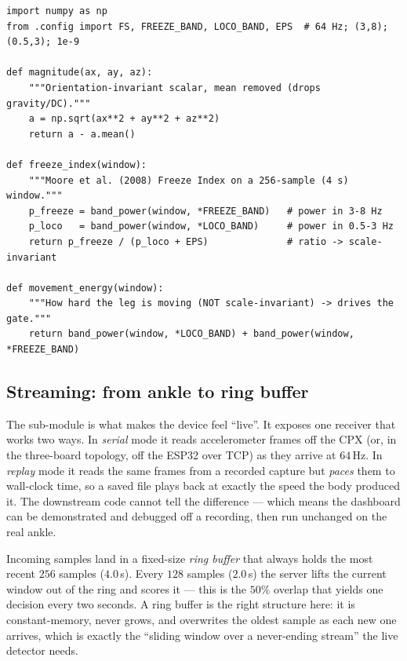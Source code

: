 \begin{lstlisting}[style=py,caption={The shipped Freeze Index, faithful to the
deployed detector. Magnitude is mean-removed; the ratio is taken over the standard
bands with the $10^{-9}$ guard.},label={lst:fi}]
import numpy as np
from .config import FS, FREEZE_BAND, LOCO_BAND, EPS  # 64 Hz; (3,8); (0.5,3); 1e-9

def magnitude(ax, ay, az):
    """Orientation-invariant scalar, mean removed (drops gravity/DC)."""
    a = np.sqrt(ax**2 + ay**2 + az**2)
    return a - a.mean()

def freeze_index(window):
    """Moore et al. (2008) Freeze Index on a 256-sample (4 s) window."""
    p_freeze = band_power(window, *FREEZE_BAND)   # power in 3-8 Hz
    p_loco   = band_power(window, *LOCO_BAND)     # power in 0.5-3 Hz
    return p_freeze / (p_loco + EPS)              # ratio -> scale-invariant

def movement_energy(window):
    """How hard the leg is moving (NOT scale-invariant) -> drives the gate."""
    return band_power(window, *LOCO_BAND) + band_power(window, *FREEZE_BAND)
\end{lstlisting}

\subsection{Streaming: from ankle to ring buffer}

The  sub-module is what makes the device feel ``live''. It exposes one
receiver that works two ways. In \emph{serial} mode it reads accelerometer frames off
the CPX (or, in the three-board topology, off the ESP32 over TCP) as they arrive at
$64$\,Hz. In \emph{replay} mode it reads the same frames from a recorded capture but
\emph{paces} them to wall-clock time, so a saved file plays back at exactly the speed
the body produced it. The downstream code cannot tell the difference --- which means
the dashboard can be demonstrated and debugged off a recording, then run unchanged on
the real ankle.

Incoming samples land in a fixed-size \emph{ring buffer} that always holds the most
recent $256$ samples ($4.0$\,s). Every $128$ samples ($2.0$\,s) the server lifts the
current window out of the ring and scores it --- this is the $50\%$ overlap that yields
one decision every two seconds. A ring buffer is the right structure here: it is
constant-memory, never grows, and overwrites the oldest sample as each new one
arrives, which is exactly the ``sliding window over a never-ending stream'' the live
detector needs.

